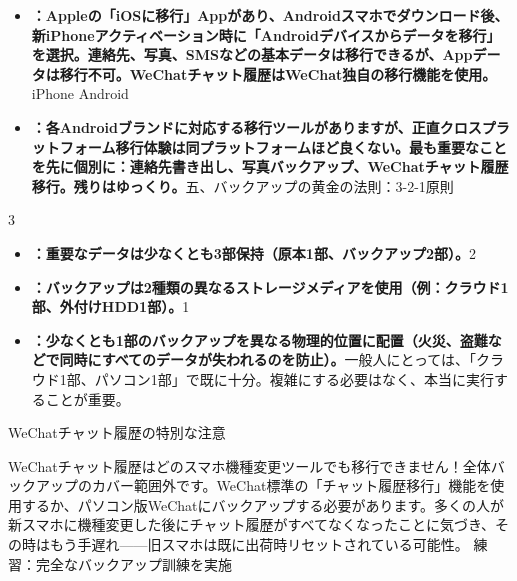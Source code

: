 \begin{itemize}
  \item \textbf{：Appleの「iOSに移行」Appがあり、Androidスマホでダウンロード後、新iPhoneアクティベーション時に「Androidデバイスからデータを移行」を選択。連絡先、写真、SMSなどの基本データは移行できるが、Appデータは移行不可。WeChatチャット履歴はWeChat独自の移行機能を使用。}iPhone Android
  \item \textbf{：各Androidブランドに対応する移行ツールがありますが、正直クロスプラットフォーム移行体験は同プラットフォームほど良くない。最も重要なことを先に個別に：連絡先書き出し、写真バックアップ、WeChatチャット履歴移行。残りはゆっくり。}五、バックアップの黄金の法則：3-2-1原則
\end{itemize}


3

\begin{itemize}
  \item \textbf{：重要なデータは少なくとも3部保持（原本1部、バックアップ2部）。}2
  \item \textbf{：バックアップは2種類の異なるストレージメディアを使用（例：クラウド1部、外付けHDD1部）。}1
  \item \textbf{：少なくとも1部のバックアップを異なる物理的位置に配置（火災、盗難などで同時にすべてのデータが失われるのを防止）。}一般人にとっては、「クラウド1部、パソコン1部」で既に十分。複雑にする必要はなく、本当に実行することが重要。
\end{itemize}

WeChatチャット履歴の特別な注意

\begin{tcbwarn}{WeChatチャット履歴はどのスマホ機種変更ツールでも移行できません！全体バックアップのカバー範囲外です。WeChat標準の「チャット履歴移行」機能を使用するか、パソコン版WeChatにバックアップする必要があります。多くの人が新スマホに機種変更した後にチャット履歴がすべてなくなったことに気づき、その時はもう手遅れ——旧スマホは既に出荷時リセットされている可能性。}
練習：完全なバックアップ訓練を実施

\end{tcbwarn}

